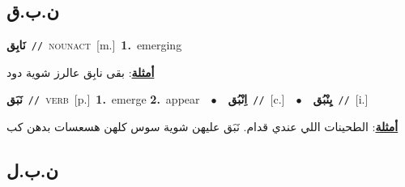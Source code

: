 \documentclass[10pt,a4paper,twoside]{article} %
\begin{document}
\begin{multicols}{2}
\vspace{-3mm}
\subsection*{\color{blue}\foreignlanguage{arabic}{ن.ب.ق}\color{blue}{}} 

{\setlength\topsep{0pt}\textbf{\foreignlanguage{arabic}{نَابِق}}\ {\color{gray}\texttt{//}\color{black}}\ \textsc{noun\textunderscore act}\ [m.]\ \textbf{1.}~emerging\  \begin{flushright}\color{gray}\foreignlanguage{arabic}{\textbf{\underline{\foreignlanguage{arabic}{أمثلة}}}: بقى نابِق عالرز شوية دود}\end{flushright}\color{black}} \vspace{2mm}

{\setlength\topsep{0pt}\textbf{\foreignlanguage{arabic}{نَبَق}}\ {\color{gray}\texttt{//}\color{black}}\ \textsc{verb}\ [p.]\ \textbf{1.}~emerge  \textbf{2.}~appear\ \ $\bullet$\ \ \setlength\topsep{0pt}\textbf{\foreignlanguage{arabic}{اِنْبُق}}\ {\color{gray}\texttt{//}\color{black}}\ [c.]\ \ $\bullet$\ \ \setlength\topsep{0pt}\textbf{\foreignlanguage{arabic}{يِنْبُق}}\ {\color{gray}\texttt{//}\color{black}}\ [i.]\  \begin{flushright}\color{gray}\foreignlanguage{arabic}{\textbf{\underline{\foreignlanguage{arabic}{أمثلة}}}: الطحينات اللي عندي قدام. نَبَق عليهن شوية سوس كلهن هسعسات بدهن كب}\end{flushright}\color{black}} \vspace{2mm}

\vspace{-3mm}
\subsection*{\color{blue}\foreignlanguage{arabic}{ن.ب.ل}\color{blue}{}} 


\end{multicols}
\end{document}
